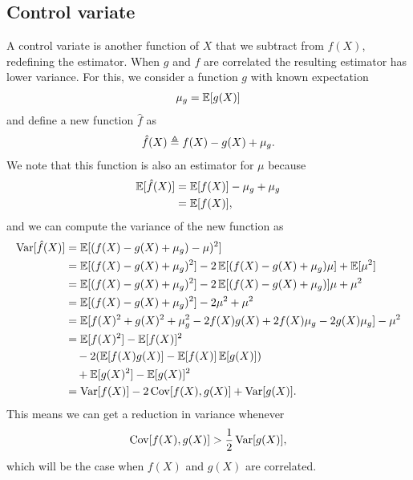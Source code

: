   \subsection{Control variate}
    A control variate is another function of $X$ that we subtract from $f(X)$, redefining the estimator. When $g$ and $f$ are correlated the resulting estimator has lower variance. For this, we consider a function $g$ with known expectation
    \begin{align*}
      \mu_{g} = \operatorname{\mathbb{E}} [ g(X) ]
    \end{align*}
    and define a new function $\hat{f}$ as
    \begin{align*}
      \hat{f}(X) \triangleq f(X) - g(X) + \mu_{g}.
    \end{align*}
    We note that this function is also an estimator for $\mu$ because
    \begin{align*}
        \operatorname{\mathbb{E}} [ \hat{f}(X) ] &= \operatorname{\mathbb{E}} [ f(X) ] - \mu_{g} + \mu_{g} \\
            &= \operatorname{\mathbb{E}} [ f(X) ],
    \end{align*}
    and we can compute the variance of the new function as
    \begin{align*}
      \operatorname{Var} [ \hat{f}(X) ]
        &= \operatorname{\mathbb{E}} [ (f(X) - g(X) + \mu_{g}) - \mu)^2 ] \\
        &= \operatorname{\mathbb{E}} [ (f(X) - g(X) + \mu_{g})^2 ] - 2\operatorname{\mathbb{E}} [ (f(X) - g(X) + \mu_{g})\mu ] + \operatorname{\mathbb{E}} [ \mu^2 ] \\
        &= \operatorname{\mathbb{E}} [ (f(X) - g(X) + \mu_{g})^2 ] - 2\operatorname{\mathbb{E}} [ (f(X) - g(X) + \mu_{g})]\mu + \mu^2 \\
        &= \operatorname{\mathbb{E}} [ (f(X) - g(X) + \mu_{g})^2 ] - 2\mu^2  + \mu^2 \\
        &= \operatorname{\mathbb{E}} [ f(X)^2 + g(X)^2 + \mu_{g}^2 - 2f(X)g(X) + 2f(X)\mu_{g} - 2g(X)\mu_{g} ] - \mu^2\\
        &= \operatorname{\mathbb{E}} [ f(X)^2 ] - \operatorname{\mathbb{E}} [ f(X) ]^2 \\
          &\quad - 2(\operatorname{\mathbb{E}} [ f(X)g(X) ] - \operatorname{\mathbb{E}} [ f(X) ]\operatorname{\mathbb{E}} [ g(X) ]) \\
          &\quad + \operatorname{\mathbb{E}} [ g(X)^2 ] - \operatorname{\mathbb{E}} [ g(X) ]^2 \\
        &= \operatorname{Var} [ f(X) ] - 2  \operatorname{Cov} [ f(X), g(X) ] + \operatorname{Var} [ g(X) ].
    \end{align*}
    This means we can get a reduction in variance whenever
    \begin{equation}
      \operatorname{Cov} [ f(X), g(X) ] > \frac{1}{2} \operatorname{Var} [ g(X) ],
      \label{eq:variance-reduction}
    \end{equation}
    which will be the case when $f(X)$ and $g(X)$ are correlated.

